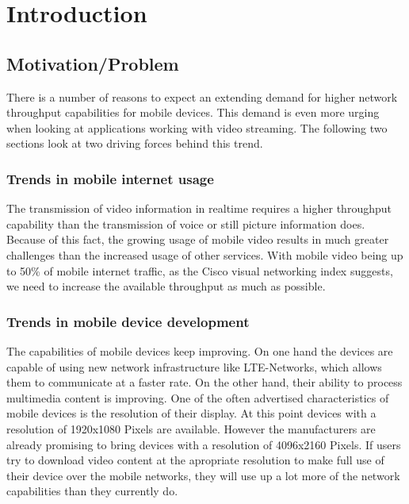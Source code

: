 \chapter{Introduction}


\section{Motivation/Problem}
There is a number of reasons to expect an extending demand for higher network throughput capabilities for mobile devices. This demand is even more urging when looking at applications working with video streaming. The following two sections look at two driving forces behind this trend.

\subsection{Trends in mobile internet usage}
The transmission of video information in realtime requires a higher throughput capability than the transmission of voice or still picture information does. Because of this fact, the growing usage of mobile video results in much greater challenges than the increased usage of other services.
With mobile video being up to 50\% of mobile internet traffic, as the Cisco visual networking index suggests, we need to increase the available throughput as much as possible.
\subsection{Trends in mobile device development}
The capabilities of mobile devices keep improving. On one hand the devices are capable of using new network infrastructure like LTE-Networks, which allows them to communicate at a faster rate. On the other hand, their ability to process multimedia content is improving. One of the often advertised characteristics of mobile devices is the resolution of their display. At this point devices with a resolution of 1920x1080 Pixels are available. However the manufacturers are already promising to bring devices with a resolution of 4096x2160 Pixels. If users try to download video content at the apropriate resolution to make full use of their device over the mobile networks, they will use up a lot more of the network capabilities than they currently do. 
